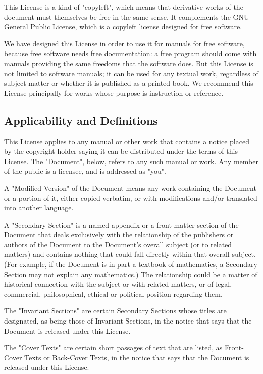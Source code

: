 	This License is a kind of "copyleft", which means that derivative works of the document must themselves be free in the same sense. It complements the GNU General Public License, which is a copyleft license designed for free software. 

	We have designed this License in order to use it for manuals for free software, because free software needs free documentation: a free program should come with manuals providing the same freedoms that the software does. But this License is not limited to software manuals; it can be used for any textual work, regardless of subject matter or whether it is published as a printed book. We recommend this License principally for works whose purpose is instruction or reference. 

	\subsection{Applicability and Definitions}
	This License applies to any manual or other work that contains a notice placed by the copyright holder saying it can be distributed under the terms of this License. The "Document", below, refers to any such manual or work. Any member of the public is a licensee, and is addressed as "you". 

	A "Modified Version" of the Document means any work containing the Document or a portion of it, either copied verbatim, or with modifications and/or translated into another language. 

	A "Secondary Section" is a named appendix or a front-matter section of the Document that deals exclusively with the relationship of the publishers or authors of the Document to the Document's overall subject (or to related matters) and contains nothing that could fall directly within that overall subject. (For example, if the Document is in part a textbook of mathematics, a Secondary Section may not explain any mathematics.) The relationship could be a matter of historical connection with the subject or with related matters, or of legal, commercial, philosophical, ethical or political position regarding them. 

	The "Invariant Sections" are certain Secondary Sections whose titles are designated, as being those of Invariant Sections, in the notice that says that the Document is released under this License. 

	The "Cover Texts" are certain short passages of text that are listed, as Front-Cover Texts or Back-Cover Texts, in the notice that says that the Document is released under this License. 

